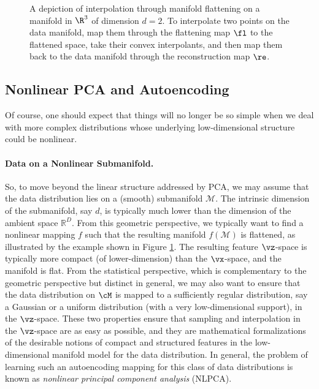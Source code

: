 \documentclass[../../book-main.tex]{subfiles}
\begin{document}
\begin{figure}
  \caption{A depiction of interpolation through manifold flattening
    on a manifold in \(\R^{3}\) of dimension \(d = 2\). To interpolate
    two points on the data manifold, map them through the flattening
    map \(\fl\) to the flattened space, take their convex interpolants,
    and then map them back to the data manifold through the
  reconstruction map \(\re\).}
  \label{fig:idealized_interpolation}
\end{figure}

\subsection{Nonlinear PCA and Autoencoding}\label{sub:nonlinear-pca}\label{sec:NLPCA}
Of course, one should expect that things will no longer be so simple
when we deal with more complex distributions whose underlying
low-dimensional structure could be nonlinear.

\paragraph{Data on a Nonlinear Submanifold.} So, to move beyond the
linear structure addressed by PCA, we may assume that the data distribution lies on a (smooth) submanifold $\mathcal{M}$. The intrinsic dimension of the submanifold, say $d$, is typically much lower than the
dimension of the ambient space $\mathbb{R}^D$. From this geometric
perspective, we typically want to find a nonlinear mapping $f$ such that
the resulting manifold
$f(\mathcal{M})$ is flattened, as illustrated by the example shown in Figure
\ref{fig:idealized_interpolation}. The resulting feature $\vz$-space
is typically
more compact (of lower-dimension) than the $\vx$-space, and the
manifold is flat.
From the statistical perspective, which is complementary to the geometric
perspective but distinct in general, we may also want to ensure that the data
distribution on $\cM$ is mapped to a sufficiently regular
distribution, say a Gaussian or a uniform distribution (with a 
very low-dimensional support), in the $\vz$-space. These two properties ensure that sampling and interpolation in the $\vz$-space are as easy as possible, and they are mathematical formalizations of the desirable
notions of compact and structured features in the low-dimensional manifold
model for the data distribution.
In general, the problem of learning such an autoencoding mapping for this class
of data distributions is known as {\em nonlinear principal component analysis}
(NLPCA).
\end{document}
